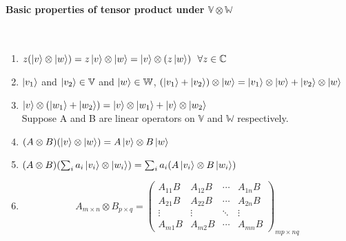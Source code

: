 \documentclass[]{article}
\theoremstyle{nonumberplain}
\begin{document}
\paragraph{Basic properties of tensor product under $\mathbb{V}\otimes\mathbb{W}$}%
\label{par:basic_properties_of_tensor_product_under_votimesw_}
\\
\begin{enumerate}
	\item $z(\ket{v}\otimes\ket{w}) = z\ket{v}\otimes\ket{w}=\ket{v}\otimes (z\ket{w})\ \ \forall z \in \mathbb{C}$
	\item $\ket{v_{1}}$ and $\ket{v_{2}} \in \mathbb{V}$ and $\ket{w}\in\mathbb{W}$, $(\ket{v_{1}}+\ket{v_{2}})\otimes \ket{w}=\ket{v_{1}}\otimes\ket{w}+\ket{v_{2}}\otimes\ket{w}$
	\item $\ket{v}\otimes(\ket{w_{1}}+\ket{w_{2}})= \ket{v}\otimes\ket{w_{1}}+\ket{v}\otimes\ket{w_{2}}$\\

		Suppose A and B are linear operators on $\mathbb{V}$ and $\mathbb{W}$ respectively.
	\item $(A\otimes B)(\ket{v}\otimes\ket{w})=A\ket{v}\otimes B\ket{w}$ 
	\item $(A\otimes B)( \sum^{}_{i} a_{i}\ket{v_{i}}\otimes\ket{w_{i}})= \sum^{}_{i} a_{i}(A\ket{v_{i}}\otimes B\ket{w_{i}})$ 
	\item
	\[
		A_{m\times n} \otimes B_{p \times q} = \begin{pmatrix} A_{11}B&A_{12}B&\cdots&A_{1n}B\\
		A_{21}B&A_{22}B&\cdots&A_{2n}B\\
		\vdots&\vdots&\ddots&\vdots\\
		A_{m1}B&A_{m2}B&\cdots&A_{mn}B
	\end{pmatrix}_{mp\times nq}
	\] 
\end{enumerate}
\end{document}
